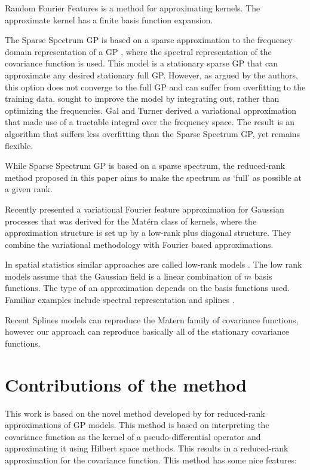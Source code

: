 \documentclass[]{interact}
\theoremstyle{plain}%
\theoremstyle{definition}
\theoremstyle{remark}
\begin{document}
Random Fourier Features \citep{rahimi2008random,rahimi2009weighted} is a method for approximating kernels. The approximate kernel has a finite basis function expansion.


The Sparse Spectrum GP is based on a sparse approximation to the frequency domain representation of a GP \citep{lazaro2010sparse,quia2010sparse}, where the spectral representation of the covariance function is used. This model is a stationary sparse GP that can approximate any desired stationary full GP. However, as argued by the authors, this option does not converge to the full GP and can suffer from overfitting to the training data. \citep{gal2015improving} sought to improve the model by integrating out, rather than optimizing the frequencies. Gal and Turner derived a variational approximation that made use of a tractable integral over the frequency space. The result is an  algorithm that suffers less overfitting than the Sparse Spectrum GP, yet remains flexible.

While Sparse Spectrum GP is based on a sparse spectrum, the reduced-rank method proposed in this paper aims to make the spectrum as ‘full’ as possible at a given rank.

Recently \citep{hensman2017variational} presented a variational Fourier feature approximation for Gaussian processes that was derived for the Mat{\'e}rn class of kernels, where the approximation structure is set up by a low-rank plus diagonal structure. They combine the variational methodology with Fourier based approximations.

In spatial statistics similar approaches are called low-rank models \citep{diggle2007springer}. The low rank models assume that the Gaussian field is a linear combination of $m$ basis functions. The type of an approximation depends on the basis functions used. Familiar examples include spectral representation \citep{diggle2007springer,paciorek2007computational,paciorek2007bayesian} and splines \citep{wood2003thin}. 

Recent Splines models can reproduce the Matern family of covariance functions, however our approach can reproduce basically all of the stationary covariance functions.


\section{Contributions of the method}

This work is based on the novel method developed by \cite{solin2018hilbert} for reduced-rank approximations of GP models. This method is based on interpreting the covariance function as the kernel of a pseudo-differential operator and approximating it using Hilbert space methods. This results in a reduced-rank approximation for the covariance function. This method has some nice features:
\end{document}
